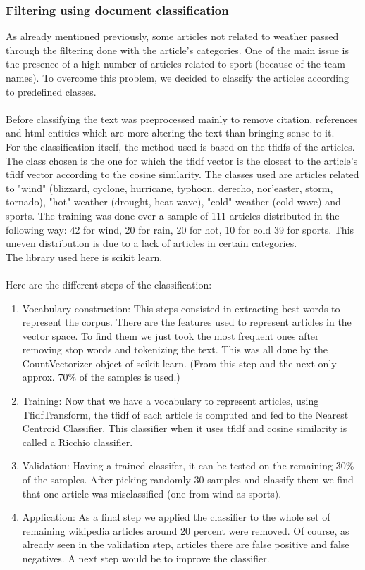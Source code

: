 \subsubsection{Filtering using document classification}
As already mentioned previously, some articles not related to weather passed through the filtering done with the article's categories. One of the main issue is the presence of a high number of articles related to sport (because of the team names). To overcome this problem, we decided to classify the articles according to predefined classes. \\\\
Before classifying the text was preprocessed mainly to remove citation, references and html entities which are more altering the text than bringing sense to it. \\
For the classification itself, the method used is based on the tfidfs of the articles. The class chosen is the one for which the tfidf vector is the closest to the article's tfidf vector according to the cosine similarity. The classes used are articles related to "wind" (blizzard, cyclone, hurricane, typhoon, derecho, nor'easter, storm, tornado), "hot" weather (drought, heat wave), "cold" weather (cold wave) and sports. The training was done over a sample of 111 articles distributed in the following way: 42 for wind, 20 for rain, 20 for hot, 10 for cold 39 for sports. This uneven distribution is due to a lack of articles in certain categories.\\
The library used here is scikit learn.\\\\
Here are the different steps of the classification:
\begin{enumerate}
  \item Vocabulary construction: This steps consisted in extracting best words to represent the corpus. There are the features used to represent articles in the vector space. To find them we just took the most frequent ones after removing stop words and tokenizing the text. This was all done by the CountVectorizer object of scikit learn. (From this step and the next only approx. 70\% of the samples is used.)
  \item Training: Now that we have a vocabulary to represent articles, using TfidfTransform, the tfidf of each article is computed and fed to the Nearest Centroid Classifier. This classifier when it uses tfidf and cosine similarity is called a Ricchio classifier.
  \item Validation: Having a trained classifer, it can be tested on the remaining 30\% of the samples. After picking randomly 30 samples and classify them we find that one article was misclassified (one from wind as sports). 
  \item Application: As a final step we applied the classifier to the whole set of remaining wikipedia articles around 20 percent were removed. Of course, as already seen in the validation step, articles there are false positive and false negatives. A next step would be to improve the classifier.
\end{enumerate}
